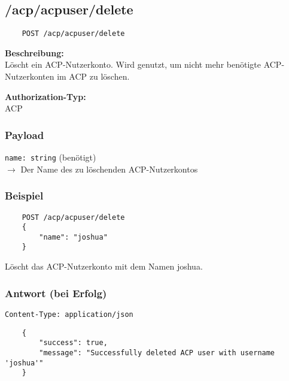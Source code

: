 \subsection{/acp/acpuser/delete}

\begin{lstlisting}
    POST /acp/acpuser/delete
\end{lstlisting}

\textbf{Beschreibung:} \\
Löscht ein ACP-Nutzerkonto. Wird genutzt, um nicht mehr benötigte ACP-Nutzerkonten im ACP zu löschen.

\textbf{Authorization-Typ:} \\
ACP

\subsubsection{Payload}

\lstinline{name: string} (benötigt) \\
$\rightarrow$ Der Name des zu löschenden ACP-Nutzerkontos

\subsubsection{Beispiel}

\begin{lstlisting}
    POST /acp/acpuser/delete
    {
        "name": "joshua"
    }
\end{lstlisting}

Löscht das ACP-Nutzerkonto mit dem Namen \glqq joshua\grqq.

\subsubsection{Antwort (bei Erfolg)}

\lstinline{Content-Type: application/json}
\begin{lstlisting}
    {
        "success": true, 
        "message": "Successfully deleted ACP user with username 'joshua'"
    }
\end{lstlisting}